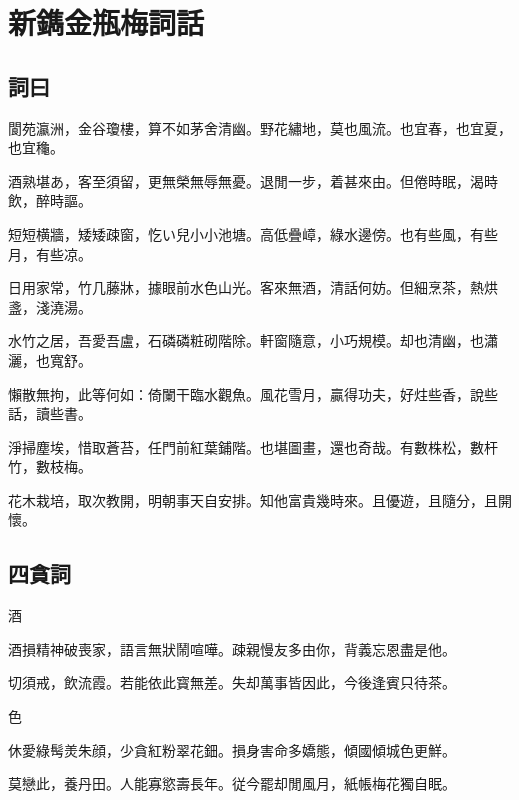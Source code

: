 \chapter*{新鐫金瓶梅詞話}
\thispagestyle{empty}

\section*{詞曰}

\begin{myquote0}
閬苑瀛洲，金谷瓊樓，算不如茅舍清幽。野花繡地，莫也風流。也宜春，也宜夏，也宜龝。

酒熟堪あ，客至須留，更無榮無辱無憂。退閒一步，着甚來由。但倦時眠，渴時飲，醉時謳。

短短横牆，矮矮疎窗，忔い兒小小池塘。高低疊嶂，綠水邊傍。也有些風，有些月，有些凉。

日用家常，竹几藤牀，據眼前水色山光。客來無酒，清話何妨。但細烹茶，熱烘盞，淺澆湯。

水竹之居，吾愛吾盧，石磷磷粧砌階除。軒窗隨意，小巧規模。却也清幽，也瀟灑，也寬舒。

懶散無拘，此等何如：倚闌干臨水觀魚。風花雪月，贏得功夫，好炷些香，說些話，讀些書。

淨掃塵埃，惜取蒼苔，任門前紅葉鋪階。也堪圖畫，還也奇哉。有數株松，數杆竹，數枝梅。

花木栽培，取次教開，明朝事天自安排。知他富貴幾時來。且優遊，且隨分，且開懷。
\end{myquote0}

\section*{四貪詞}

酒

\begin{myquote0}
酒損精神破喪家，語言無狀鬧喧嘩。疎親慢友多由你，背義忘恩盡是他。

切須戒，飲流霞。若能依此寳無差。失却萬事皆因此，今後逢賓只待茶。
\end{myquote0}

色

\begin{myquote0}
休愛綠髩羙朱顔，少貪紅粉翠花鈿。損身害命多嬌態，傾國傾城色更鮮。

莫戀此，養丹田。人能寡慾壽長年。従今罷却閒風月，紙帳梅花獨自眠。
\end{myquote0}

